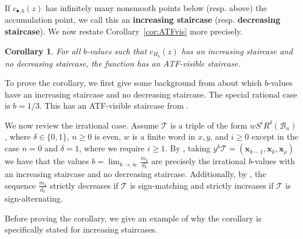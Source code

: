 \documentclass[11pt, reqno]{amsart}
\newtheorem{cor}[thm]{Corollary}
\theoremstyle{remark}
\numberwithin{equation}{subsection}
\numberwithin{figure}{section}
\theoremstyle{customremark}
\newcommand{\Tt}{\mathcal{T}}
\begin{document}
If $c_{\bullet,b}(z)$ has infinitely many nonsmooth points below (resp. above) the accumulation point, we call this an {\bf increasing staircase} (resp. {\bf decreasing staircase}). We now restate Corollary~\ref{cor:ATFvis} more precisely. 

\begin{cor} \label{cor:ATFvis2}
For all $b$-values such that $c_{H_b}(z)$ has an increasing staircase and no decreasing staircase, the function has an ATF-visible staircase. 
\end{cor}

To prove the corollary, we first give some background from \cite{MMW,MPW} about which $b$-values have an increasing staircase and no decreasing staircase. The special rational case is $b=1/3.$ This has an ATF-visible staircase from \cite{AADT,McSi}. 


We now review the irrational case. Assume $\Tt$ is a triple of the form $wS^iR^\delta(\mathcal{B}_n)$, where $\delta\in\{0,1\}$, $n\geq 0$ is even, $w$ is a finite word in $x,y$, and $i\geq 0$ except in the case $n=0$ and $\delta=1$, where we require $i\geq 1$.
By \cite{MMW,MPW}, taking $y^k\Tt=(\bm{x}_{k-1},\bm{x}_k,\bm{x}_\rho)$ we have that the values $b=\lim_{k\to \infty}\frac{m_k}{d_k}$ are precisely the irrational $b$-values with an increasing staircase and no decreasing staircase. Additionally, by \cite[Corollary 4.2.6]{MM}, the sequence $\frac{m_{k}}{d_{k}}$ strictly decreases if $\Tt$ is sign-matching and strictly increases if $\Tt$ is sign-alternating. 

Before proving the corollary, we give an example of why the corollary is specifically stated for increasing staircases. 
\end{document}
